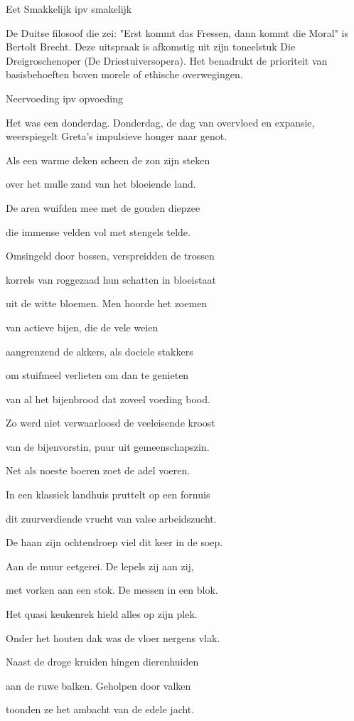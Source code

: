 Eet Smakkelijk ipv smakelijk

De Duitse filosoof die zei: "Erst kommt das Fressen, dann kommt die Moral" is Bertolt Brecht. Deze uitspraak is afkomstig uit zijn toneelstuk Die Dreigroschenoper (De Driestuiversopera). Het benadrukt de prioriteit van basisbehoeften boven morele of ethische overwegingen.

Neervoeding ipv opvoeding

Het was een donderdag.
Donderdag, de dag van overvloed en expansie, weerspiegelt Greta’s impulsieve honger naar genot.

Als een warme deken
scheen de zon zijn steken

over het mulle zand
van het bloeiende land.

De aren wuifden mee
met de gouden diepzee

die immense velden
vol met stengels telde.

Omsingeld door bossen,
verspreidden de trossen

korrels van roggezaad
hun schatten in bloeistaat

uit de witte bloemen.
Men hoorde het zoemen

van actieve bijen,
die de vele weien

aangrenzend de akkers,
als dociele stakkers

om stuifmeel verlieten
om dan te genieten

van al het bijenbrood
dat zoveel voeding bood.

Zo werd niet verwaarloosd
de veeleisende kroost

van de bijenvorstin,
puur uit gemeenschapszin.

Net als noeste boeren
zoet de adel voeren.

In een klassiek landhuis
pruttelt op een fornuis

dit zuurverdiende vrucht
van valse arbeidszucht.

De haan zijn ochtendroep
viel dit keer in de soep.

Aan de muur eetgerei.
De lepels zij aan zij,

met vorken aan een stok.
De messen in een blok.

Het quasi keukenrek
hield alles op zijn plek.

Onder het houten dak
was de vloer nergens vlak.

Naast de droge kruiden
hingen dierenhuiden

aan de ruwe balken.
Geholpen door valken

toonden ze het ambacht
van de edele jacht.

